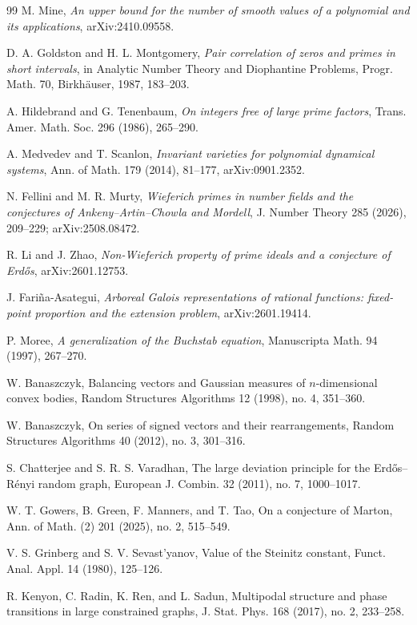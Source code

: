 \documentclass[11pt]{article}
\theoremstyle{definition}
\begin{document}
\begin{thebibliography}{99}
 M. Mine,
\emph{An upper bound for the number of smooth values of a polynomial and its applications},
arXiv:2410.09558.

 D. A. Goldston and H. L. Montgomery,
\emph{Pair correlation of zeros and primes in short intervals},
in Analytic Number Theory and Diophantine Problems, Progr. Math. 70,
Birkh\"auser, 1987, 183--203.

 A. Hildebrand and G. Tenenbaum,
\emph{On integers free of large prime factors},
Trans. Amer. Math. Soc. 296 (1986), 265--290.

 A. Medvedev and T. Scanlon,
\emph{Invariant varieties for polynomial dynamical systems},
Ann. of Math. 179 (2014), 81--177, arXiv:0901.2352.


 N. Fellini and M. R. Murty,
\emph{Wieferich primes in number fields and the conjectures of
Ankeny--Artin--Chowla and Mordell}, J. Number Theory 285 (2026), 209--229;
arXiv:2508.08472.

 R. Li and J. Zhao,
\emph{Non-Wieferich property of prime ideals and a conjecture of Erd\H{o}s},
arXiv:2601.12753.

 J. Fari\~na-Asategui,
\emph{Arboreal Galois representations of rational functions: fixed-point proportion
and the extension problem}, arXiv:2601.19414.

 P. Moree,
\emph{A generalization of the Buchstab equation}, Manuscripta Math. 94 (1997), 267--270.


W. Banaszczyk,
Balancing vectors and Gaussian measures of $n$-dimensional convex
bodies,
Random Structures Algorithms 12 (1998), no. 4, 351--360.

W. Banaszczyk,
On series of signed vectors and their rearrangements,
Random Structures Algorithms 40 (2012), no. 3, 301--316.


S. Chatterjee and S. R. S. Varadhan,
The large deviation principle for the Erd\H os--R\'enyi random graph,
European J. Combin. 32 (2011), no. 7, 1000--1017.

W. T. Gowers, B. Green, F. Manners, and T. Tao,
On a conjecture of Marton,
Ann. of Math. (2) 201 (2025), no. 2, 515--549.


V. S. Grinberg and S. V. Sevast'yanov,
Value of the Steinitz constant,
Funct. Anal. Appl. 14 (1980), 125--126.

R. Kenyon, C. Radin, K. Ren, and L. Sadun,
Multipodal structure and phase transitions in large constrained
graphs,
J. Stat. Phys. 168 (2017), no. 2, 233--258.


\end{thebibliography}
\end{document}

